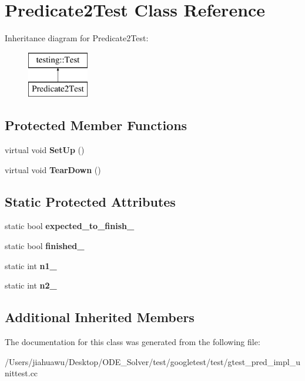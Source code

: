 \hypertarget{class_predicate2_test}{}\section{Predicate2\+Test Class Reference}
\label{class_predicate2_test}
Inheritance diagram for Predicate2\+Test\+:\begin{figure}[H]
\begin{center}
\leavevmode
\includegraphics[height=2.000000cm]{class_predicate2_test}
\end{center}
\end{figure}
\subsection*{Protected Member Functions}
\begin{DoxyCompactItemize}
\item 
\mbox{\label{class_predicate2_test_a9778563daf4846327d32061c1a8ccba0}} 
virtual void {\bfseries Set\+Up} ()
\item 
\mbox{\label{class_predicate2_test_a7379f8f7772af6b4c76edcc90b6aaaeb}} 
virtual void {\bfseries Tear\+Down} ()
\end{DoxyCompactItemize}
\subsection*{Static Protected Attributes}
\begin{DoxyCompactItemize}
\item 
\mbox{\label{class_predicate2_test_a56cf1f0f556addd9a62e0644dc1a86fc}} 
static bool {\bfseries expected\+\_\+to\+\_\+finish\+\_\+}
\item 
\mbox{\label{class_predicate2_test_a30f4ef76d3004253078e767e5c653b85}} 
static bool {\bfseries finished\+\_\+}
\item 
\mbox{\label{class_predicate2_test_ac002d8e279b24e75906fd19973fc2170}} 
static int {\bfseries n1\+\_\+}
\item 
\mbox{\label{class_predicate2_test_a9dbe5173570b9b911af2df889c287027}} 
static int {\bfseries n2\+\_\+}
\end{DoxyCompactItemize}
\subsection*{Additional Inherited Members}


The documentation for this class was generated from the following file\+:\begin{DoxyCompactItemize}
\item 
/\+Users/jiahuawu/\+Desktop/\+O\+D\+E\+\_\+\+Solver/test/googletest/test/gtest\+\_\+pred\+\_\+impl\+\_\+unittest.\+cc\end{DoxyCompactItemize}
